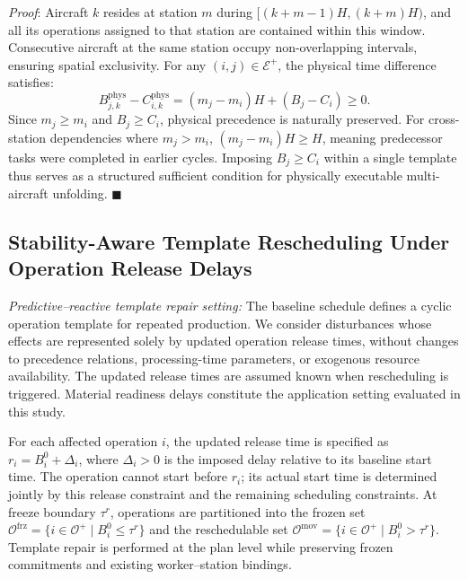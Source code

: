 \documentclass[journal,10pt]{IEEEtran}
\begin{document}
\textit{Proof}: Aircraft $k$ resides at station $m$ during $[(k+m-1)H, (k+m)H)$, and all its operations assigned to that station are contained within this window. Consecutive aircraft at the same station occupy non-overlapping intervals, ensuring spatial exclusivity. For any $(i,j)\in\mathcal{E}^+$, the physical time difference satisfies:
\begin{equation}
B_{j,k}^{\mathrm{phys}} - C_{i,k}^{\mathrm{phys}} = (m_j - m_i)H + (B_j - C_i) \ge 0.
\end{equation}
Since $m_j\ge m_i$ and $B_j\ge C_i$, physical precedence is naturally preserved. For cross-station dependencies where $m_j>m_i$, $(m_j-m_i)H\ge H$, meaning predecessor tasks were completed in earlier cycles. Imposing $B_j\ge C_i$ within a single template thus serves as a structured sufficient condition for physically executable multi-aircraft unfolding. \hfill $\blacksquare$

\subsection{Stability-Aware Template Rescheduling Under Operation Release Delays}

\textit{Predictive--reactive template repair setting:} The baseline schedule defines a cyclic operation template for repeated production. We consider disturbances whose effects are represented solely by updated operation release times, without changes to precedence relations, processing-time parameters, or exogenous resource availability. The updated release times are assumed known when rescheduling is triggered. Material readiness delays constitute the application setting evaluated in this study.

For each affected operation $i$, the updated release time is specified as $r_i=B_i^0+\Delta_i$, where $\Delta_i>0$ is the imposed delay relative to its baseline start time. The operation cannot start before $r_i$; its actual start time is determined jointly by this release constraint and the remaining scheduling constraints. At freeze boundary $\tau^r$, operations are partitioned into the frozen set $\mathcal{O}^{\mathrm{frz}}=\{i\in\mathcal{O}^+\mid B_i^0\le\tau^r\}$ and the reschedulable set $\mathcal{O}^{\mathrm{mov}}=\{i\in\mathcal{O}^+\mid B_i^0>\tau^r\}$. Template repair is performed at the plan level while preserving frozen commitments and existing worker--station bindings.
\end{document}
